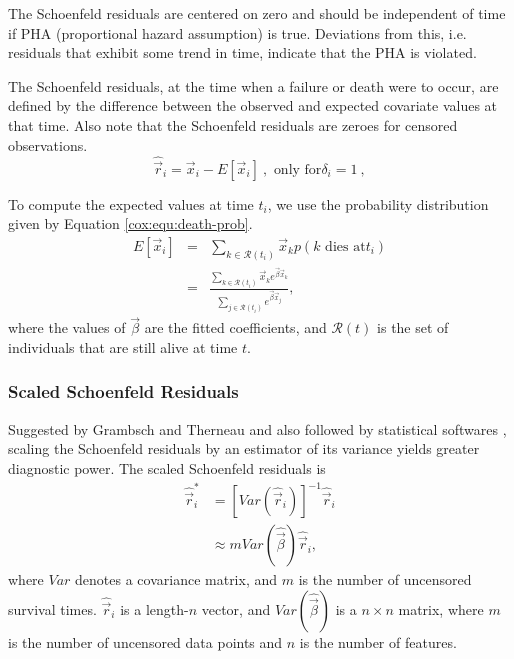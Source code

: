 
The Schoenfeld residuals are centered on zero and should be
independent of time if PHA (proportional hazard assumption) is
true. Deviations from this, i.e. residuals that exhibit some trend in
time, indicate that the PHA is violated.

The Schoenfeld residuals, at the time when a failure or death were to occur, are
defined by the difference between the observed and expected covariate values at
that time. Also note that the Schoenfeld residuals are zeroes for censored
observations.
\begin{equation}
\hat{\vec{r}}_i = \vec{x}_i - E[\vec{x}_i]\ ,\mbox{ only for
}\delta_i=1\ ,
\end{equation}

To compute the expected values at time $t_{i}$, we use the probability distribution given by Equation \ref{cox:equ:death-prob}.
\begin{eqnarray}
E[\vec{x}_i] &=& \sum_{k\in \mathcal{R}(t_i)}\vec{x}_k p(k\mbox{ dies at
}t_i) \nonumber\\
&=& \frac{\sum_{k\in \mathcal{R}(t_i)}\vec{x}_k
  e^{\vec{\beta}\vec{x}_k}}{\sum_{j\in
    \mathcal{R}(t_i)}e^{\vec{\beta}\vec{x}_j} },
\end{eqnarray}
where the values of $\vec{\beta}$ are the fitted coefficients, and $\mathcal{R}(t)$ is the set of individuals that are still alive at time $t$.

\subsubsection{Scaled Schoenfeld Residuals}\label{cox:scaled-residual}
Suggested by Grambsch and Therneau \cite{grambsch1994proportional} and also
followed by statistical softwares \cite{testph}, scaling the Schoenfeld
residuals by an estimator of its variance yields greater diagnostic power. The
scaled Schoenfeld residuals is
\begin{eqnarray}
\hat{\vec{r}}^{*}_i &= [\mathit{Var}(\hat{\vec{r}}_i)]^{-1} \hat{\vec{r}}_i\\
&\approx m \mathit{Var}(\hat{\vec{\beta}}) \hat{\vec{r}}_i  ,
\end{eqnarray}
where $\mathit{Var}$ denotes a covariance matrix, and $m$ is the
number of uncensored survival times. $\hat{\vec{r}}_i$ is a length-$n$
vector, and $\mathit{Var}(\hat{\vec{\beta}})$ is a $n\times n$
matrix, where $m$ is the number of uncensored data points and $n$ is
the number of features.

